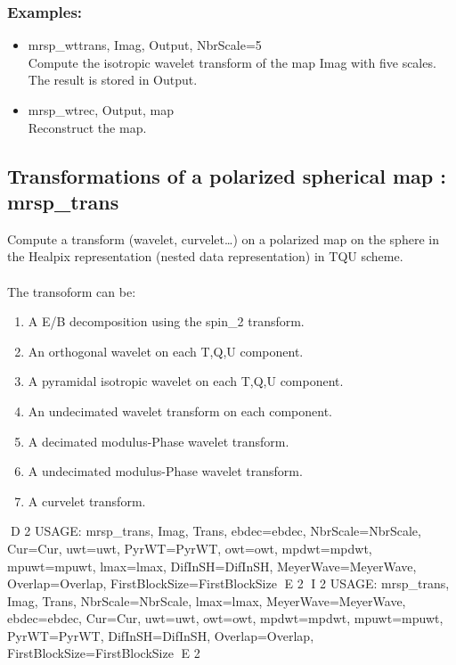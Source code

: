 \subsubsection*{Examples:} 
\begin{itemize}
\item mrsp\_wttrans, Imag, Output, NbrScale=5 \\
Compute the isotropic wavelet transform of the map Imag with five scales. The result is stored in Output.
\item mrsp\_wtrec, Output, map \\
Reconstruct the map. 
\end{itemize}



\subsection{Transformations of a polarized spherical map : mrsp\_trans}
Compute a transform (wavelet, curvelet\ldots) on a polarized map on the sphere in the Healpix representation (nested data representation) in TQU scheme.\\ \\
The transoform can be:
\begin{enumerate}
\item A E/B decomposition using the spin\_2 transform.
\item An orthogonal wavelet on each T,Q,U component.
\item A pyramidal isotropic wavelet on each T,Q,U component.
\item An undecimated wavelet transform on each component.
\item A decimated modulus-Phase wavelet transform.
\item A undecimated modulus-Phase wavelet transform.
\item A curvelet transform.
\end{enumerate}
{\bf
\begin{center}
D 2
     USAGE: mrsp\_trans, Imag, Trans, ebdec=ebdec, NbrScale=NbrScale, Cur=Cur, uwt=uwt, PyrWT=PyrWT, owt=owt, mpdwt=mpdwt, mpuwt=mpuwt, 
     lmax=lmax, DifInSH=DifInSH, MeyerWave=MeyerWave, Overlap=Overlap, FirstBlockSize=FirstBlockSize
E 2
I 2
     USAGE: mrsp\_trans, Imag, Trans, NbrScale=NbrScale, lmax=lmax, MeyerWave=MeyerWave, ebdec=ebdec, Cur=Cur, uwt=uwt, owt=owt, mpdwt=mpdwt, mpuwt=mpuwt, PyrWT=PyrWT, 
     DifInSH=DifInSH, Overlap=Overlap, FirstBlockSize=FirstBlockSize
E 2
\end{center}}
